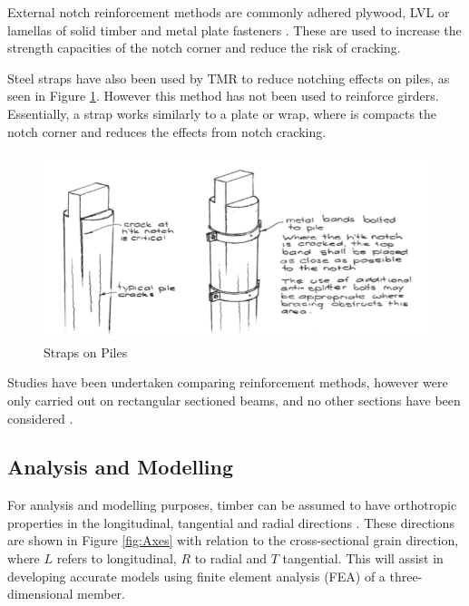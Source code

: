 \documentclass[11pt,a4paper]{article}
\numberwithin{equation}{subsection}
\begin{document}
\noindent
External notch reinforcement methods are commonly adhered plywood, LVL or lamellas of solid timber and metal plate fasteners \cite{jockwer_structural_2014,fawwaz_structural_2012}. These are used to increase the strength capacities of the notch corner and reduce the risk of cracking. 

\vspace*{\baselineskip}

\noindent
Steel straps have also been used by TMR to reduce notching effects on piles, as seen in Figure \ref{fig:External}. However this method has not been used to reinforce girders. Essentially, a strap works similarly to a plate or wrap, where is compacts the notch corner and reduces the effects from notch cracking. 

	\begin{figure}[h]
		\includegraphics[scale=0.6]{Piles}
		\caption{Straps on Piles \cite{_timber_2005}}
		\label{fig:External}
	\end{figure} 
	\pagebreak

\noindent
Studies have been undertaken comparing reinforcement methods, however were only carried out on rectangular sectioned beams, and no other sections have been considered  \cite{jockwer_structural_2014}.

\subsection{Analysis and Modelling}
For analysis and modelling purposes, timber can be assumed to have orthotropic properties in the longitudinal, tangential and radial directions \cite{kim_modeling_2010}. These directions are shown in Figure \ref{fig:Axes} with relation to the cross-sectional grain direction, where $L$ refers to longitudinal, $R$ to radial and $T$ tangential. This will assist in developing accurate models using finite element analysis (FEA) of a three-dimensional member. 
\end{document}

